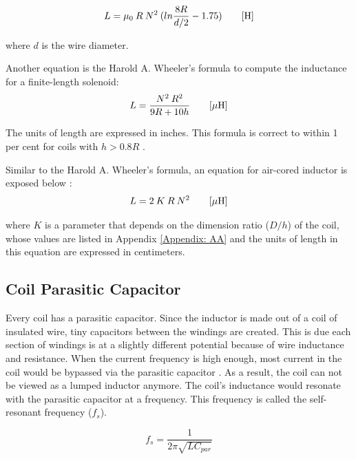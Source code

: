 \begin{equation}\label{Eq:typical}
L=\mu_0\:R\:N^2\:(ln\frac{8R}{d/2}-1.75)\qquad [\textnormal{H}]
\end{equation}

where $d$ is the wire diameter.

Another equation is the Harold A. Wheeler’s formula to compute the inductance for a finite-length solenoid:
\begin{equation}\label{Eq:Harold}
L=\frac{N^2\:R^2}{9R+10h}\qquad [\mu \textnormal{H}]
\end{equation}

The units of length are expressed in inches. This formula is correct to within 1 per cent for coils with $h>0.8R$ \cite{wheeler}.

Similar to the Harold A. Wheeler’s formula, an equation for air-cored inductor is exposed below \cite{WaiKaiChen}:
\begin{equation}\label{Eq:Wai}
L=2\:K\:R\:N^2\qquad [\mu \textnormal{H}]
\end{equation}

where $K$ is a parameter that depends on the dimension ratio ($D/h$) of the coil, whose values are listed in Appendix \ref{Appendix: AA} and the units of length in this equation are expressed in centimeters.












		\subsection{Coil Parasitic Capacitor}
Every coil has a parasitic capacitor. Since the inductor is made out of a coil of insulated wire, tiny capacitors between the windings are created. This is due each section of windings is at a slightly different potential because of wire inductance and resistance. When the current frequency is high enough, most current in the coil would be bypassed via the parasitic capacitor \cite{medical}. As a result, the coil can not be viewed as a lumped inductor anymore. The coil's inductance would resonate with the parasitic capacitor at a frequency. This frequency is called the self-resonant frequency ($f_s$).

\begin{equation}
	f_{s} = \frac{1}{2\pi\sqrt{LC_{par}}}
\end{equation}

